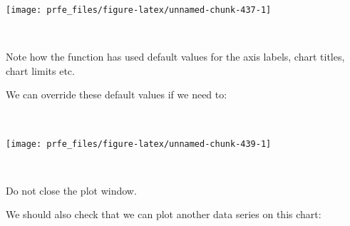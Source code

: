 \documentclass[12pt,a4paper]{book}
\newenvironment{Shaded}{\begin{snugshade}}{\end{snugshade}}
\newcommand{\DataTypeTok}[1]{\textcolor[rgb]{0.13,0.29,0.53}{#1}}
\newcommand{\DecValTok}[1]{\textcolor[rgb]{0.00,0.00,0.81}{#1}}
\newcommand{\KeywordTok}[1]{\textcolor[rgb]{0.13,0.29,0.53}{\textbf{#1}}}
\newcommand{\NormalTok}[1]{#1}
\newcommand{\OperatorTok}[1]{\textcolor[rgb]{0.81,0.36,0.00}{\textbf{#1}}}
\newcommand{\OtherTok}[1]{\textcolor[rgb]{0.56,0.35,0.01}{#1}}
\newcommand{\StringTok}[1]{\textcolor[rgb]{0.31,0.60,0.02}{#1}}
\theoremstyle{definition}
\theoremstyle{definition}
\theoremstyle{definition}
\theoremstyle{remark}
\begin{document}
\begin{center}\texttt{[image: prfe\_files/figure-latex/unnamed-chunk-437-1]} \end{center}

~

Note how the function has used default values for the axis labels, chart
titles, chart limits etc.

We can override these default values if we need to:

~

\begin{Shaded}
\end{Shaded}

\newpage

\begin{center}\texttt{[image: prfe\_files/figure-latex/unnamed-chunk-439-1]} \end{center}

~

Do not close the plot window.

We should also check that we can plot another data series on this chart:

~

\begin{Shaded}
\end{Shaded}
\end{document}
